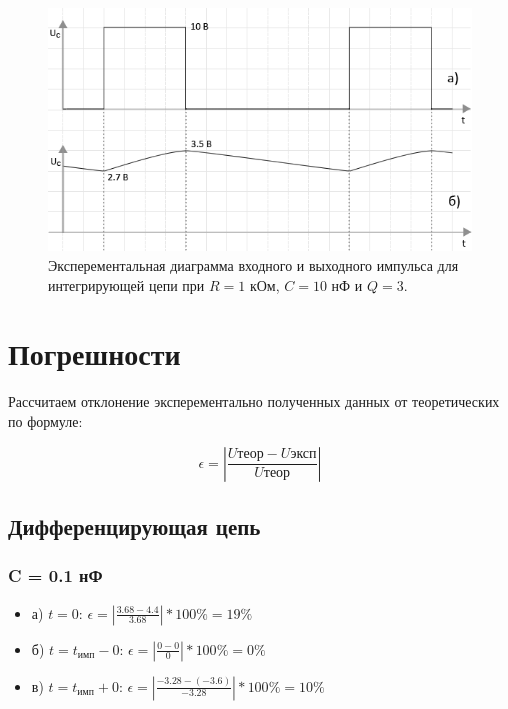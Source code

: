 \begin{figure}[H]
	\begin{center}
		\includegraphics[width=14cm]{img/q3}
		\caption{Эксперементальная диаграмма входного и выходного импульса для интегрирующей цепи при $R = 1$ кОм, $C = 10$ нФ и $Q = 3$.}
		\label{t:2} %
	\end{center}
\end{figure}

\section{Погрешности}

Рассчитаем отклонение эксперементально полученных данных от теоретических по формуле:

\begin{equation}
		\epsilon = |\frac{U\text{теор}-U\text{эксп}}{U\text{теор}}|
\end{equation}

\subsection{Дифференцирующая цепь}
\subsubsection{C = 0.1 нФ}
\begin{itemize}
\item[] а) $t = 0$: $\epsilon = |\frac{3.68 - 4.4}{ 3.68 }| * 100\% = 19 \%$

\item[] б) $t = t_\text{имп} - 0$: $\epsilon = |\frac{0 - 0}{ 0 }| * 100\% = 0 \%$

\item[] в) $t = t_\text{имп} + 0$: $\epsilon = |\frac{-3.28 - (-3.6)}{ -3.28 }| * 100\% = 10 \%$ 
\end{itemize}

